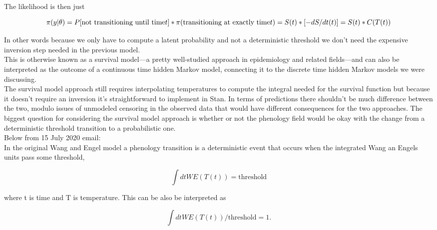 \documentclass[11pt,letter]{article}
\begin{document}
The likelihood is then just

\begin{center}
\begin{equation*}
\pi(y | \theta)\\
= P[\mbox{not transitioning until time} t] * \pi(\mbox{transitioning at exactly time} t)\\
= S(t) * [- dS/dt(t) ]\\
= S(t) * C(T(t))
\end{equation*}
\end{center}

In other words because we only have to compute a latent probability
and not a deterministic threshold we don’t need the expensive inversion 
step needed in the previous model.\\

This is otherwise known as a survival model---a pretty well-studied 
approach in epidemiology and related fields---and can also be 
interpreted as the outcome of a continuous time hidden Markov 
model, connecting it to the discrete time hidden Markov models we
were discussing.\\

The survival model approach still requires interpolating temperatures
to compute the integral needed for the survival function but because 
it doesn’t require an inversion it’s straightforward to implement in Stan.
In terms of predictions there shouldn’t be much difference between the 
two, modulo issues of unmodeled censoring in the observed data that 
would have different consequences for the two approaches.  The biggest 
question for considering the survival model approach is  whether or not 
the phenology field would be okay with the change from a deterministic 
threshold transition to a probabilistic one.\\

Below from 15 July 2020 email:\\
 
In the original Wang and Engel model a phenology transition is a deterministic 
event that occurs when the integrated Wang an Engels units pass some threshold,

\begin{equation*}
\int dt WE(T(t)) = \mbox{threshold}
\end{equation*}

where t is time and T is temperature.  This can be also be interpreted as

\begin{equation*}
\int dt WE(T(t)) / \mbox{threshold} = 1.
\end{equation*}
\end{document}
